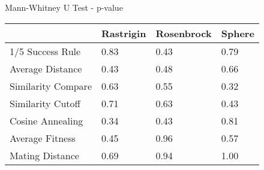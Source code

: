     \begin{frame}{Mann-Whitney U Test - p-value}
        \centering
        \begin{tabular}{l||l|l|l}
                           & Rastrigin & Rosenbrock & Sphere \\ \hline
        1/5 Success Rule   & 0.83      & 0.43       &  0.79  \\
        Average Distance   & 0.43      & 0.48       &  0.66  \\
        Similarity Compare & 0.63      & 0.55       &  0.32  \\
        Similarity Cutoff  & 0.71      & 0.63       &  0.43  \\
        Cosine Annealing   & 0.34      & 0.43       &  0.81  \\
        Average Fitness    & 0.45      & 0.96       &  0.57  \\
        Mating Distance    & 0.69      & 0.94       &  1.00    
        \end{tabular}
    \end{frame}


